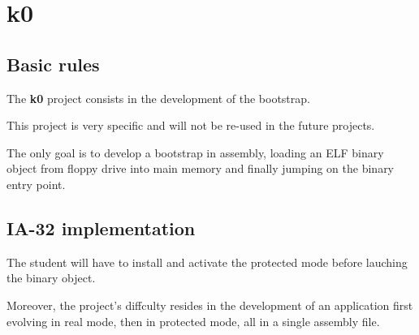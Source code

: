 
%
%

\section{k0}

\subsection{Basic rules}

The \textbf{k0} project consists in the development of the bootstrap.

This project is very specific and will not be re-used in the future
projects.

The only  goal is to develop  a bootstrap in assembly,  loading an ELF
binary object from  floppy drive into main memory  and finally jumping
on the binary entry point.

%
%

\subsection{IA-32 implementation}

The student will have to install and activate the protected mode before
lauching the binary object.

Moreover, the project's diffculty resides in the development of an
application first evolving in real mode, then in protected mode, all
in a single assembly file.
